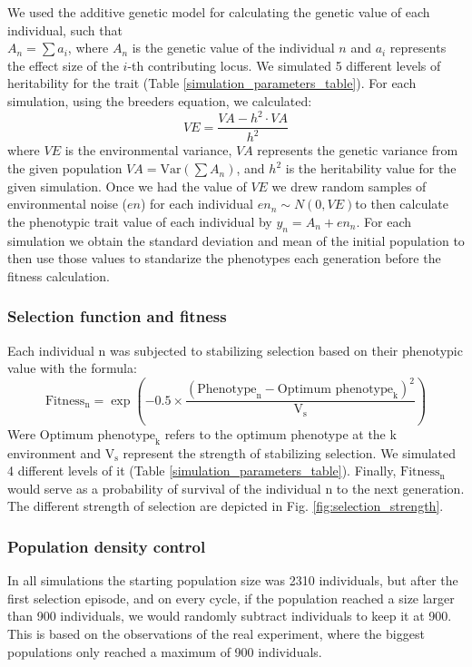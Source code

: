 \documentclass{article}
\begin{document}
We used the additive genetic model for calculating the genetic value of each individual, such that \\ $A_n=\sum a_i$, where $A_n$ is the genetic value of the individual $n$ and \( a_i \) represents the effect size of the \( i \)-th contributing locus. We simulated 5 different levels of heritability for the trait (Table \ref{simulation_parameters_table}). For each simulation, using the breeders equation, we calculated:
\[
VE = \frac{VA - h^2 \cdot VA}{h^2}
\]
where \( VE \) is the environmental variance, \( VA \) represents the genetic variance from the given population \( VA = \text{Var}\left(\sum A_n\right) \), and \( h^2 \) is the heritability value for the given simulation. Once we had the value of \( VE \) we drew random samples of environmental noise (\( en \)) for each individual \( en_n \sim N(0, VE) \)to then calculate the phenotypic trait value of each individual by \( y_n = A_n+ en_n \). For each simulation we obtain the standard deviation and mean of the initial population to then use those values to standarize the phenotypes each generation before the fitness calculation.

\subsubsection{Selection function and fitness}
Each individual n was subjected to stabilizing selection based on their phenotypic value with the formula:
\[
\text{Fitness}_\text{n} = \exp\left(-0.5 \times \frac{(\text{Phenotype}_\text{n} - {\text{Optimum phenotype}_\text{k}})^2}{\text{V}_\text{s}}\right)
\]
Were $\text{Optimum phenotype}_\text{k}$ refers to the optimum phenotype at the k environment and $\text{V}_\text{s}$ represent the strength of stabilizing selection. We simulated 4 different levels of it (Table \ref{simulation_parameters_table}). Finally,  $\text{Fitness}_\text{n}$ would serve as a probability of survival of the individual n to the next generation. The different strength of selection are depicted in Fig. \ref{fig:selection_strength}. 

\subsubsection{Population density control}
In all simulations the starting population size was 2310 individuals, but after the first selection episode, and on every cycle, if the population reached a size larger than 900 individuals, we would randomly subtract individuals to keep it at 900. This is based on the observations of the real experiment, where the biggest populations only reached a maximum of 900 individuals. 
\end{document}
